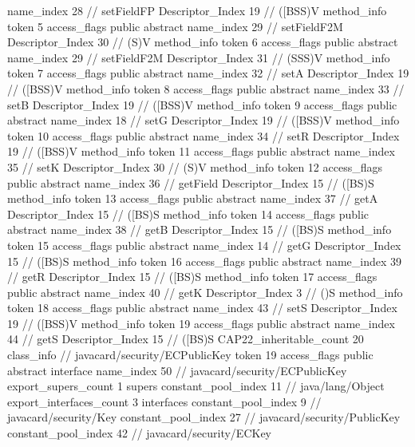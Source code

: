 {{{{{					name_index	28		// setFieldFP
					Descriptor_Index	19		// ([BSS)V
				}
				method_info {
					token	5
					access_flags	public abstract
					name_index	29		// setFieldF2M
					Descriptor_Index	30		// (S)V
				}
				method_info {
					token	6
					access_flags	public abstract
					name_index	29		// setFieldF2M
					Descriptor_Index	31		// (SSS)V
				}
				method_info {
					token	7
					access_flags	public abstract
					name_index	32		// setA
					Descriptor_Index	19		// ([BSS)V
				}
				method_info {
					token	8
					access_flags	public abstract
					name_index	33		// setB
					Descriptor_Index	19		// ([BSS)V
				}
				method_info {
					token	9
					access_flags	public abstract
					name_index	18		// setG
					Descriptor_Index	19		// ([BSS)V
				}
				method_info {
					token	10
					access_flags	public abstract
					name_index	34		// setR
					Descriptor_Index	19		// ([BSS)V
				}
				method_info {
					token	11
					access_flags	public abstract
					name_index	35		// setK
					Descriptor_Index	30		// (S)V
				}
				method_info {
					token	12
					access_flags	public abstract
					name_index	36		// getField
					Descriptor_Index	15		// ([BS)S
				}
				method_info {
					token	13
					access_flags	public abstract
					name_index	37		// getA
					Descriptor_Index	15		// ([BS)S
				}
				method_info {
					token	14
					access_flags	public abstract
					name_index	38		// getB
					Descriptor_Index	15		// ([BS)S
				}
				method_info {
					token	15
					access_flags	public abstract
					name_index	14		// getG
					Descriptor_Index	15		// ([BS)S
				}
				method_info {
					token	16
					access_flags	public abstract
					name_index	39		// getR
					Descriptor_Index	15		// ([BS)S
				}
				method_info {
					token	17
					access_flags	public abstract
					name_index	40		// getK
					Descriptor_Index	3		// ()S
				}
				method_info {
					token	18
					access_flags	public abstract
					name_index	43		// setS
					Descriptor_Index	19		// ([BSS)V
				}
				method_info {
					token	19
					access_flags	public abstract
					name_index	44		// getS
					Descriptor_Index	15		// ([BS)S
				}
			}
			CAP22_inheritable_count	20
		}
		class_info {		// javacard/security/ECPublicKey
			token	19
			access_flags	public abstract interface
			name_index	50		// javacard/security/ECPublicKey
			export_supers_count	1
			supers {
				constant_pool_index	11		// java/lang/Object
			}
			export_interfaces_count	3
			interfaces {
				constant_pool_index	9		// javacard/security/Key
				constant_pool_index	27		// javacard/security/PublicKey
				constant_pool_index	42		// javacard/security/ECKey
}}}}
